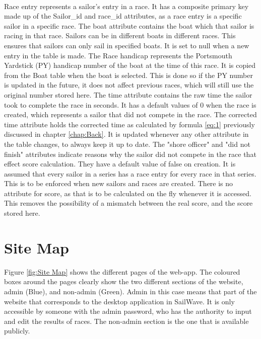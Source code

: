\documentclass{l4proj}
\begin{document}
\begin{outline}
    \hfill\\
    \1
    Race entry represents a sailor's entry in a race. It has a composite primary key made up of the Sailor\_id and race\_id attributes, as a race entry is a specific sailor in a specific race.
        \2
        The boat attribute contains the boat which that sailor is racing in that race. Sailors can be in different boats in different races. This ensures that sailors can only sail in specified boats. It is set to null when a new entry in the table is made.
        \2
        The Race handicap represents the Portsmouth Yardstick (PY) handicap number of the boat at the time of this race. It is copied from the Boat table when the boat is selected. This is done so if the PY number is updated in the future, it does not affect previous races, which will still use the original number stored here.
        \2
        The time attribute contains the raw time the sailor took to complete the race in seconds. It has a default values of 0 when the race is created, which represents a sailor that did not compete in the race.
        \2
        The corrected time attribute holds the corrected time as calculated by formula \ref{eq:1} previously discussed in chapter \ref{chap:Back}. It is updated whenever any other attribute in the table changes, to always keep it up to date.
        \2
        The "shore officer" and "did not finish" attributes indicate reasons why the sailor did not compete in the race that effect score calculation. They have a default value of false on creation.
        \2
        It is assumed that every sailor in a series has a race entry for every race in that series. This is to be enforced when new sailors and races are created. There is no attribute for score, as that is to be calculated on the fly whenever it is accessed. This removes the possibility of a mismatch between the real score, and the score stored here.
\end{outline}

\section{Site Map}

Figure \ref{fig:Site Map} shows the different pages of the web-app. The coloured boxes around the pages clearly show the two different sections of the website, admin (Blue), and non-admin (Green). Admin in this case means that part of the website that corresponds to the desktop application in SailWave. It is only accessible by someone with the admin password, who has the authority to input and edit the results of races. The non-admin section is the one that is available publicly.
\end{document}
